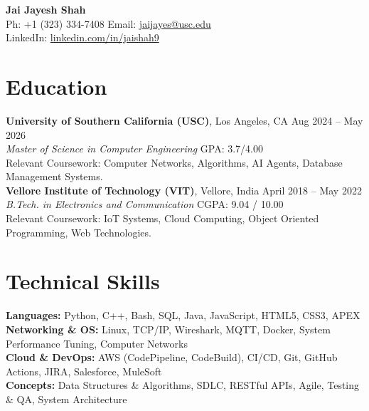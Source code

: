 \documentclass[letterpaper,10pt]{article}
\begin{document}
\begin{center}
    {\LARGE \textbf{Jai Jayesh Shah}} \\
    \vspace{4pt}
    \small
    Ph: +1 (323) 334-7408 \quad Email: \href{mailto:jaijayes@usc.edu}{jaijayes@usc.edu} \\
    LinkedIn: \href{https://www.linkedin.com/in/jaishah9}{linkedin.com/in/jaishah9} \\
    \vspace{-10pt}
\end{center}

\section*{Education}
    \textbf{University of Southern California (USC)}, Los Angeles, CA \hfill Aug 2024 -- May 2026 \\
    \textit{Master of Science in Computer Engineering} \hfill GPA: 3.7/4.00 \\
    Relevant Coursework: Computer Networks, Algorithms, AI Agents, Database Management Systems. \\

    \vspace{2pt}
    \textbf{Vellore Institute of Technology (VIT)}, Vellore, India \hfill April 2018 -- May 2022 \\
    \textit{B.Tech. in Electronics and Communication} \hfill CGPA: 9.04 / 10.00 \\
    Relevant Coursework: IoT Systems, Cloud Computing, Object Oriented Programming, Web Technologies.

\section*{Technical Skills}
    \textbf{Languages:} Python, C++, Bash, SQL, Java, JavaScript, HTML5, CSS3, APEX \\
    \textbf{Networking \& OS:} Linux, TCP/IP, Wireshark, MQTT, Docker, System Performance Tuning, Computer Networks \\
    \textbf{Cloud \& DevOps:} AWS (CodePipeline, CodeBuild), CI/CD, Git, GitHub Actions, JIRA, Salesforce, MuleSoft \\
    \textbf{Concepts:} Data Structures \& Algorithms, SDLC, RESTful APIs, Agile, Testing \& QA, System Architecture

\end{document}
